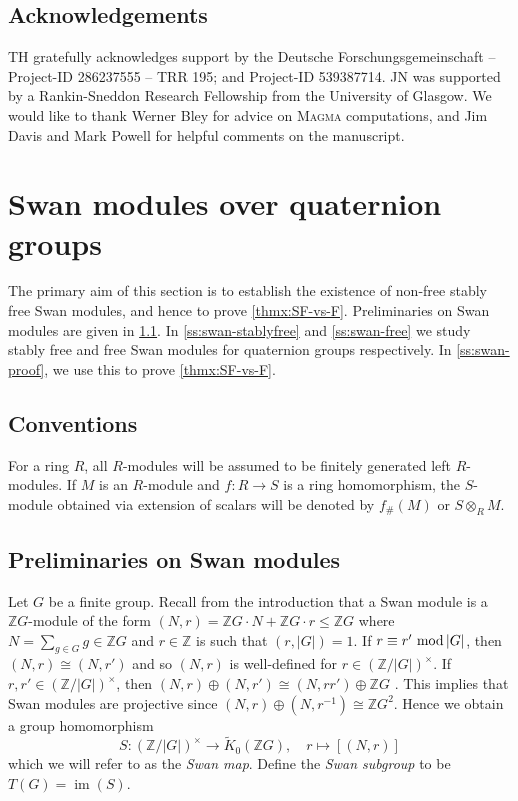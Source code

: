 \documentclass[11pt,leqno,a4paper]{amsart}
\newcommand{\Z}{\mathbb{Z}}
\renewcommand{\mod}{\,\,\text{\normalfont mod}\,}
\DeclareMathOperator{\IM}{im}
\theoremstyle{definition}
\theoremstyle{remark}
\theoremstyle{custom}
\newcommand{\wt}{\widetilde}
\begin{document}
\subsection*{Acknowledgements} 
TH gratefully acknowledges support by the Deutsche Forschungsgemeinschaft -- Project-ID 286237555 -- TRR 195; and Project-ID 539387714.
JN was supported by a Rankin-Sneddon Research Fellowship from the University of Glasgow.
We would like to thank Werner Bley for advice on \textsc{Magma} computations, and Jim Davis and Mark Powell for helpful comments on the manuscript.

\section{Swan modules over quaternion groups} \label{s:swan-modules}

The primary aim of this section is to establish the existence of non-free stably free Swan modules, and hence to prove \cref{thmx:SF-vs-F}.
Preliminaries on Swan modules are given in \cref{ss:swan-prelim}.
In \cref{ss:swan-stablyfree} and \cref{ss:swan-free} we study stably free and free Swan modules for quaternion groups respectively. In \cref{ss:swan-proof}, we use this to prove \cref{thmx:SF-vs-F}.

\subsection*{Conventions} 
For a ring $R$, all $R$-modules will be assumed to be finitely generated left $R$-modules. If $M$ is an $R$-module and $f : R \to S$ is a ring homomorphism, the $S$-module obtained via extension of scalars will be denoted by $f_\#(M)$ or $S \otimes_R M$.

\subsection{Preliminaries on Swan modules}
\label{ss:swan-prelim}

Let $G$ be a finite group. Recall from the introduction that a Swan module is a $\Z G$-module of the form $(N,r) = \Z G \cdot N + \Z G \cdot r \le \Z G$ where $N = \sum_{g \in G} g \in \Z G$ and $r \in \Z$ is such that $(r,|G|)=1$. If $r \equiv r' \mod |G|$, then $(N,r) \cong (N,r')$ \cite[Lemma 6.1 (a)]{Sw60-II} and so $(N,r)$ is well-defined for $r \in (\Z/|G|)^\times$. If $r, r' \in (\Z/|G|)^\times$, then $(N,r) \oplus (N,r') \cong (N,rr') \oplus \Z G$ \cite[Lemma 6.1 (c)]{Sw60-II}. This implies that Swan modules are projective since $(N,r) \oplus (N,r^{-1}) \cong \Z G^2$. Hence we obtain a group homomorphism
\[ S : (\Z/|G|)^\times \to \wt K_0(\Z G), \quad r \mapsto [(N,r)] \]
which we will refer to as the \textit{Swan map}. Define the \textit{Swan subgroup} to be $T(G) = \IM(S)$.
\end{document}
